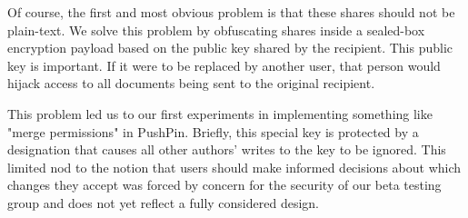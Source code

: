 Of course, the first and most obvious problem is that these shares should not be plain-text. We solve this problem by obfuscating shares inside a sealed-box encryption payload based on the public key shared by the recipient. This public key is important. If it were to be replaced by another user, that person would hijack access to all documents being sent to the original recipient.

This problem led us to our first experiments in implementing something like "merge permissions" in PushPin. Briefly, this special key is protected by a designation that causes all other authors' writes to the key to be ignored. This limited nod to the notion that users should make informed decisions about which changes they accept was forced by concern for the security of our beta testing group and does not yet reflect a fully considered design.

